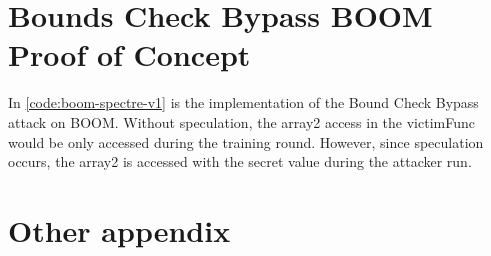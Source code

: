 \appendix
\section{Bounds Check Bypass BOOM Proof of Concept}

In \ref{code:boom-spectre-v1} is the implementation of the Bound Check Bypass attack
on BOOM. Without speculation, the array2 access in the victimFunc would be only accessed
during the training round. However, since speculation occurs, the array2 is accessed with
the secret value during the attacker run.

\onecolumn

\label{code:boom-spectre-v1}

\section{Other appendix}

